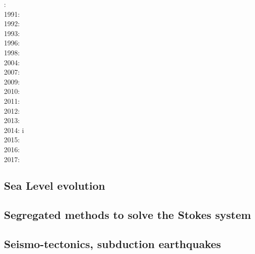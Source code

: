 {\scriptsize
{}: \cite{woid78}\\
1991: \cite{tars91}\\
1992: \cite{zaju92}\\
1993: \cite{nabr93}\cite{vasv93}\cite{wejv93}\cite{wein93}\\
1996: \cite{maar96}\\
1998: \cite{giju98}\\
2004: \cite{istt04}\cite{geim04}\cite{mcmg04}\\
2007: \cite{huja07}\cite{maqs07}\\
2009: \cite{grba09}\\
2010: \cite{albe10}\cite{albi10}\cite{inbe10}\cite{inbe10b}\cite{albs10}\\
2011: \cite{brfo11}\\
2012: \cite{fejr12}\cite{liqi12}\cite{grbe12}\cite{albe12}\cite{grbi12}\cite{goib12}\cite{rukb12}\\
2013: \cite{gobi13}\cite{nipc13}\\
2014: \cite{bakp14}\cite{feka14a}\cite{feka14b}\cite{ghbu14}\cite{nifh14}i\cite{peel14}\\
2015: \cite{feka15}\cite{cofk15}\\
2016: \cite{masg16}\cite{albe16}\\
2017: \cite{grbe17}\cite{henf17}
}

\subsection{Sea Level evolution}

{\scriptsize
\noindent
\cite{pefc78}
\cite{pazw07}
\cite{cohu09}
\cite{conr13}
}

\subsection{Segregated methods to solve the Stokes system}


{\scriptsize
\noindent
\cite{raju91}
\cite{haeh93}
\cite{leru95}
\cite{duto98}
\cite{wade03}
\cite{wade04}
\cite{utne08}
}

\subsection{Seismo-tectonics, subduction earthquakes}


